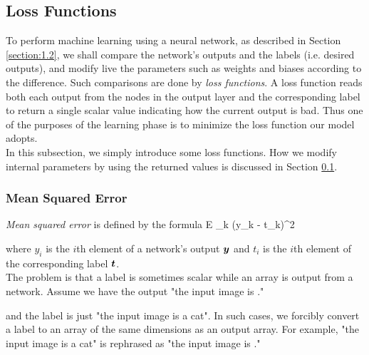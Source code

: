 \documentclass{article}
\theoremstyle{definition}
\newcommand{\sect}[1]{Section \ref{section:#1}}
\begin{document}
\subsection{Loss Functions} \label{section:3.5}

To perform machine learning using a neural network, as described in \sect{1.2}, we shall compare the network's outputs and the labels (i.e. desired outputs), and modify live the parameters such as weights and biases according to the difference. Such comparisons are done by {\it loss functions}. A loss function reads both each output from the nodes in the output layer and the corresponding label to return a single scalar value indicating how the current output is bad. Thus one of the purposes of the learning phase is to minimize the loss function our model adopts.\\

In this subsection, we simply introduce some loss functions. How we modify internal parameters by using the returned values is discussed in \sect{3.5}.

\subsubsection{Mean Squared Error} \label{section:3.3.1}

{\it Mean squared error} is defined by the formula
\begineq
E \equiv \half \sum _k (y_k - t_k)^2 
\edeq

where $y_i$ is the $i$th element of a network's output $\bmy$ and $t_i$ is the $i$th element of the corresponding label $\bmt$.\\

The problem is that a label is sometimes scalar while an array is output from a network. Assume we have the output "the input image is
\begineq
{}." \nonumber
\edeq

and the label is just "the input image is a cat". In such cases, we forcibly convert a label to an array of the same dimensions as an output array. For example, "the input image is a cat" is rephrased as "the input image is
\begineq
{}." \nonumber
\edeq
\end{document}

